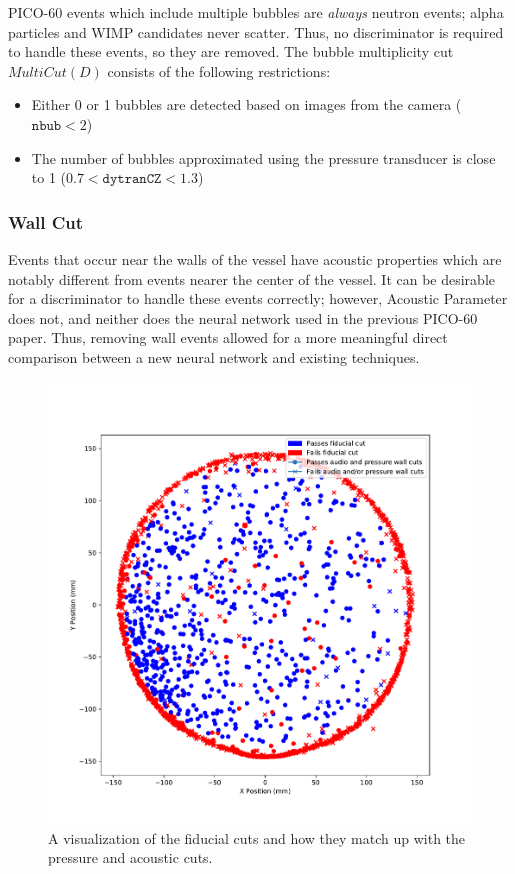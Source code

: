 \documentclass[10pt]{article}
\begin{document}
PICO-60 events which include multiple bubbles are \textit{always} neutron events; alpha particles and WIMP candidates never scatter. Thus, no discriminator is required to handle these events, so they are removed. The bubble multiplicity cut $MultiCut(D)$ consists of the following restrictions:

\begin{itemize}
    \item Either 0 or 1 bubbles are detected based on images from the camera ($\texttt{nbub}<2$)
    \item The number of bubbles approximated using the pressure transducer is close to 1 ($0.7<\texttt{dytranCZ}<1.3$)
\end{itemize}

\subsubsection{Wall Cut}

Events that occur near the walls of the vessel have acoustic properties which are notably different from events nearer the center of the vessel. It can be desirable for a discriminator to handle these events correctly; however, Acoustic Parameter does not, and neither does the neural network used in the previous PICO-60 paper. Thus, removing wall events allowed for a more meaningful direct comparison between a new neural network and existing techniques.

\begin{figure}[h!]
    \centering
    \includegraphics[width=\textwidth]{wall_event_positions}
    \caption{\label{} A visualization of the fiducial cuts and how they match up with the pressure and acoustic cuts.}
\end{figure}
\end{document}
